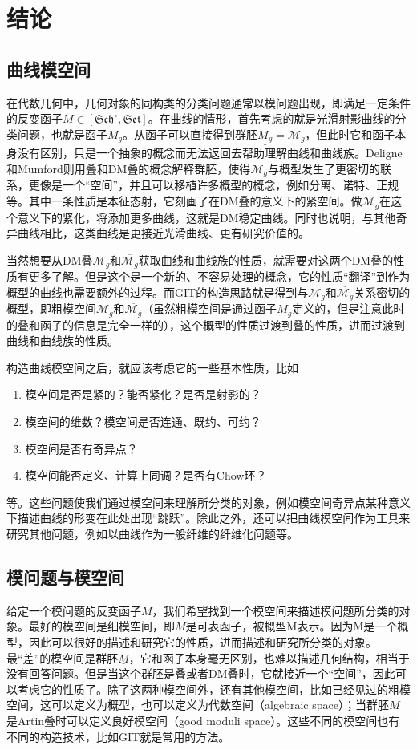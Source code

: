 \chapter{结论}
\section{曲线模空间}
在代数几何中，几何对象的同构类的分类问题通常以模问题出现，即满足一定条件的反变函子$ M\in [\mathfrak{Sch}^\circ,\mathfrak{Set}] $。在曲线的情形，首先考虑的就是光滑射影曲线的分类问题，也就是函子$ M_g $。从函子可以直接得到群胚$ \underline{M_g}=\mathscr{M}_g $，但此时它和函子本身没有区别，只是一个抽象的概念而无法返回去帮助理解曲线和曲线族。Deligne和Mumford则用叠和DM叠的概念解释群胚，使得$ \mathscr{M}_g $与概型发生了更密切的联系，更像是一个“空间”，并且可以移植许多概型的概念，例如分离、诺特、正规等。其中一条性质是本征态射，它刻画了在DM叠的意义下的紧空间。做$ \mathscr{M}_g $在这个意义下的紧化，将添加更多曲线，这就是DM稳定曲线。同时也说明，与其他奇异曲线相比，这类曲线是更接近光滑曲线、更有研究价值的。

当然想要从DM叠$ \mathscr{M}_g $和$ \overline{\mathscr{M}_g} $获取曲线和曲线族的性质，就需要对这两个DM叠的性质有更多了解。但是这个是一个新的、不容易处理的概念，它的性质“翻译”到作为概型的曲线也需要额外的过程。而GIT的构造思路就是得到与$ \mathscr{M}_g $和$ \overline{\mathscr{M}_g} $关系密切的概型，即粗模空间$ \mathcal{M}_g $和$ \overline{\mathcal{M}_g} $（虽然粗模空间是通过函子$ M_g $定义的，但是注意此时的叠和函子的信息是完全一样的），这个概型的性质过渡到叠的性质，进而过渡到曲线和曲线族的性质。

构造曲线模空间之后，就应该考虑它的一些基本性质，比如
\begin{enumerate}
	\item 模空间是否是紧的？能否紧化？是否是射影的？
	\item 模空间的维数？模空间是否连通、既约、可约？
	\item 模空间是否有奇异点？
	\item 模空间能否定义、计算上同调？是否有Chow环？
\end{enumerate}
等。这些问题使我们通过模空间来理解所分类的对象，例如模空间奇异点某种意义下描述曲线的形变在此处出现“跳跃”。除此之外，还可以把曲线模空间作为工具来研究其他问题，例如以曲线作为一般纤维的纤维化问题等。

\section{模问题与模空间}
给定一个模问题的反变函子$ M $，我们希望找到一个模空间来描述模问题所分类的对象。最好的模空间是细模空间，即$ M $是可表函子，被概型$ \mathrm{M} $表示。因为$ \mathrm{M} $是一个概型，因此可以很好的描述和研究它的性质，进而描述和研究所分类的对象。最“差”的模空间是群胚$ \underline{M} $，它和函子本身毫无区别，也难以描述几何结构，相当于没有回答问题。但是当这个群胚是叠或者DM叠时，它就接近一个“空间”，因此可以考虑它的性质了。除了这两种模空间外，还有其他模空间，比如已经见过的粗模空间，这可以定义为概型，也可以定义为代数空间（algebraic space）；当群胚$ \underline{M} $是Artin叠时可以定义良好模空间（good moduli space）。这些不同的模空间也有不同的构造技术，比如GIT就是常用的方法。

